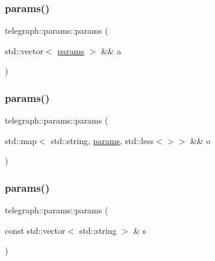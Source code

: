 \mbox{\label{classtelegraph_1_1params_aae149f5beddeae6ed0b3809f70952b49}} 
\subsubsection{\texorpdfstring{params()}{params()}\hspace{0.1cm}{\footnotesize\ttfamily [12/17]}}
{\footnotesize\ttfamily telegraph\+::params\+::params (\begin{DoxyParamCaption}\item[{std\+::vector$<$ \hyperlink{classtelegraph_1_1params}{params} $>$ \&\&}]{a }\end{DoxyParamCaption})\hspace{0.3cm}{\ttfamily [inline]}}

\mbox{\label{classtelegraph_1_1params_a2e508304e48171ca494f38371276d9d8}} 
\subsubsection{\texorpdfstring{params()}{params()}\hspace{0.1cm}{\footnotesize\ttfamily [13/17]}}
{\footnotesize\ttfamily telegraph\+::params\+::params (\begin{DoxyParamCaption}\item[{std\+::map$<$ std\+::string, \hyperlink{classtelegraph_1_1params}{params}, std\+::less$<$$>$$>$ \&\&}]{o }\end{DoxyParamCaption})\hspace{0.3cm}{\ttfamily [inline]}}

\mbox{\label{classtelegraph_1_1params_a8760b698892fb0f7f15c12368ede1352}} 
\subsubsection{\texorpdfstring{params()}{params()}\hspace{0.1cm}{\footnotesize\ttfamily [14/17]}}
{\footnotesize\ttfamily telegraph\+::params\+::params (\begin{DoxyParamCaption}\item[{const std\+::vector$<$ std\+::string $>$ \&}]{s }\end{DoxyParamCaption})\hspace{0.3cm}{\ttfamily [inline]}}

